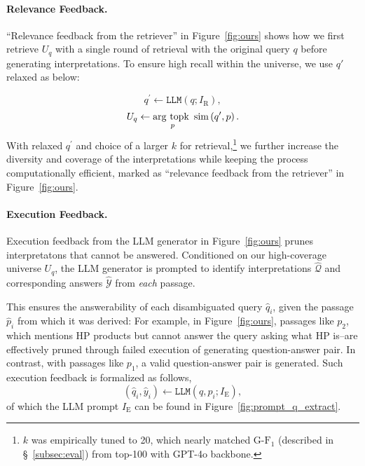 \paragraph{Relevance Feedback.}


``Relevance feedback from the retriever'' in Figure~\ref{fig:ours} shows how
we first retrieve
$U_q$ with a single round of retrieval with the original query $q$ before generating interpretations. To ensure high recall within the universe, we use $q'$ relaxed as below:

\begin{equation}
q^\prime \leftarrow \texttt{LLM}(q; I_{\textrm{R}}),  
\end{equation}
\begin{equation}
U_q \leftarrow \argtopk_{p} \mathrm{sim} \left( q^\prime, p \right).
\end{equation}
With relaxed $q^\prime$ and
choice of a larger \(k\) for retrieval,\footnote{$k$ was empirically tuned to 20, which nearly matched G-$\textrm{F}_1$ (described in \S~\ref{subsec:eval}) from top-100 with GPT-4o backbone.}
we further increase the diversity and coverage of the interpretations while keeping the process computationally efficient, marked as ``relevance feedback from the retriever'' in Figure~\ref{fig:ours}.



\paragraph{Execution Feedback.} 
Execution feedback from the LLM generator in Figure~\ref{fig:ours}
prunes interpretatons that cannot be answered.
Conditioned on our high-coverage universe $U_q$, the LLM generator is prompted to identify interpretations $\hat{\mathcal{Q}}$ and corresponding answers $\hat{\mathcal{Y}}$ from \emph{each} passage.

This ensures the answerability of each disambiguated query $\hat{q}_i$, given the passage $\hat{p}_i$ from which it was derived:
For example, in Figure~\ref{fig:ours},
passages like $p_2$, which mentions HP products but cannot answer the query asking what HP is--are effectively pruned through failed execution of generating question-answer pair.
In contrast, with passages like $p_1$, a valid question-answer pair is generated.
Such execution feedback is formalized as follows,
\begin{equation}
(\hat{q}_i, \hat{y}_i) \leftarrow \texttt{LLM}(q, p_i; I_{\textrm{E}}),
\label{eq:ours_q_extract_single}
\end{equation}
of which the LLM prompt $I_{\textrm{E}}$ can be found in Figure~\ref{fig:prompt_q_extract}.

